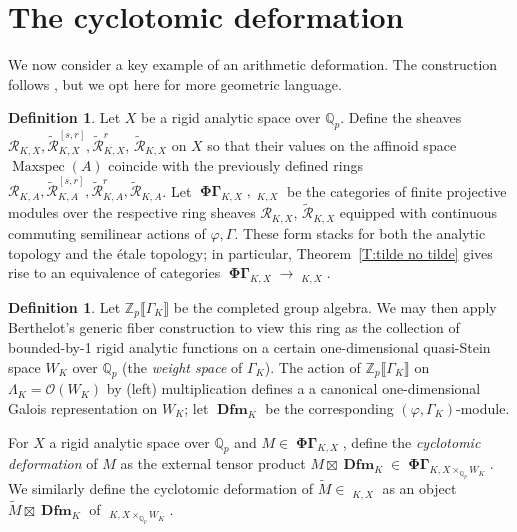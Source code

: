 \documentclass[12pt]{amsart}
\theoremstyle{definition}
\newtheorem{defn}[theorem]{Definition}
\numberwithin{equation}{theorem}
\newcommand{\Qp}{\mathbb{Q}_p}
\newcommand{\QQ}{\mathbb{Q}}
\newcommand{\ZZ}{\mathbb{Z}}
\newcommand{\calO}{\mathcal{O}}
\newcommand{\calR}{\mathcal{R}}
\DeclareMathOperator{\Dfm}{\mathbf{Dfm}}
\DeclareMathOperator{\Maxspec}{Maxspec}
\DeclareMathOperator{\PhiGamma}{\mathbf{\Phi \Gamma}}
\DeclareMathOperator{\PhiGammatilde}{\widetilde{\mathbf{\Phi \Gamma}}}
\begin{document}
\section{The cyclotomic deformation}

We now consider a key example of an arithmetic deformation. The construction follows
\cite[Definition~4.4.7]{kpx}, but we opt here for  more geometric language.

\begin{defn}
Let $X$ be a rigid analytic space over $\QQ_p$. 
Define the sheaves $\calR_{K,X}, \tilde{\calR}^{[s,r]}_{K,X}, \tilde{\calR}^{r}_{K,X}$,
$\tilde{\calR}_{K,X}$ on $X$ so that their values on the affinoid space $\Maxspec(A)$
coincide with the previously defined rings $\calR_{K,A}, \tilde{\calR}^{[s,r]}_{K,A}, \tilde{\calR}^{r}_{K,A}, \tilde{\calR}_{K,A}$.
Let $\PhiGamma_{K,X}, \PhiGammatilde_{K,X}$ be the categories of finite projective
modules over the respective ring sheaves $\calR_{K,X}$, $\tilde{\calR}_{K,X}$ equipped with continuous commuting semilinear actions of $\varphi, \Gamma$. 
These form stacks for both the analytic topology and the \'etale topology; in particular, Theorem~\ref{T:tilde no tilde} gives rise to an equivalence of categories $\PhiGamma_{K,X} \to \PhiGammatilde_{K,X}$.
\end{defn}

\begin{defn}
Let $\ZZ_p \llbracket \Gamma_K \rrbracket$ be the completed group algebra. We may then apply Berthelot's generic fiber construction to view this ring as the collection of bounded-by-1 rigid analytic functions on a certain one-dimensional quasi-Stein space $W_K$ over $\QQ_p$ (the \emph{weight space} of $\Gamma_K$).
The action of $\ZZ_p \llbracket \Gamma_K \rrbracket$ on $\Lambda_K = \calO(W_K)$ by (left) multiplication
defines a a canonical one-dimensional Galois representation on $W_K$; let $\Dfm_{K}$ be the corresponding $(\varphi, \Gamma_K)$-module.

For $X$ a rigid analytic space over $\QQ_p$ and $M \in \PhiGamma_{K,X}$,
define the \emph{cyclotomic deformation} of $M$
as the external tensor product $M \boxtimes \Dfm_{K} \in \PhiGamma_{K,X \times_{\Qp} W_K}$. We similarly define the cyclotomic deformation of $\tilde{M} \in \PhiGammatilde_{K,X}$ as an object $\tilde{M} \boxtimes \Dfm_{K}$ of $\PhiGammatilde_{K,X \times_{\Qp} W_K}$.
\end{defn}
\end{document}

